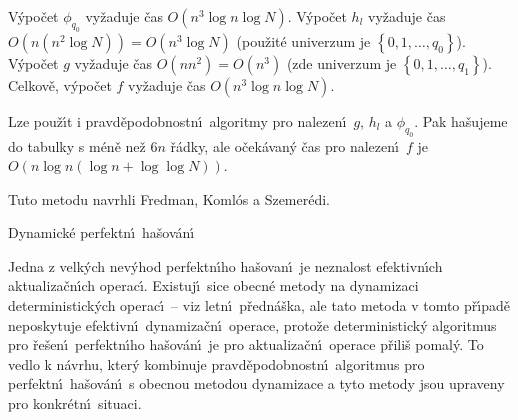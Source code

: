 \flushpar V\'ypo\v cet $\phi_{q_0}$ vy\v zaduje \v cas $O\left(n^3\log 
n\log N\right)$. V\'ypo\v cet $h_l$ 
vy\v za\-du\-je \v cas $O\left(n\left(n^2\log N\right)\right)=O\left(n^3\log N\right)$ (pou\v zit\'e univerzum je 
$\left\{0,1,\dots,q_0\right\}$). V\'ypo\v cet $g$ vy\v zaduje \v cas $O\left(nn^2
\right)=O\left(n^3\right)$ 
(zde univerzum je $\left\{0,1,\dots,q_1\right\}$). Celkov\v e, 
v\'ypo\v cet $f$ vy\v zaduje \v cas $O\left(n^3\log n\log N\right)$.
\medskip

\flushpar Lze pou\v z\'\i t i pravd\v epodobnostn\'\i\ algoritmy pro nalezen\'\i\ 
$g$, $h_l$ a $\phi_{q_0}$. Pak ha\v sujeme do tabulky s m\'en\v e ne\v z $
6n$ 
\v r\'adky, ale o\v cek\'avan\'y \v cas pro nalezen\'\i\ $f$ je 
$O\left(n\log n\left(\log n+\log\log N\right)\right)$.
\bigskip

\flushpar Tuto metodu navrhli Fredman, Koml\'os a Szemer\'edi.
\medskip

\subhead
Dynamick\'e perfektn\'\i\ ha\v sov\'an\'\i
\endsubhead
\smallskip

\flushpar Jedna z velk\'ych nev\'yhod perfektn\'\i ho ha\v sovan\'\i\ je 
neznalost efektivn\'\i ch aktualiza\v cn\'\i ch ope\-rac\'\i . Existuj\'\i\ sice 
obecn\'e meto\-dy na dynamizaci deterministick\'ych operac\'\i\ -- viz 
letn\'\i\ p\v redn\'a\v s\-ka, ale tato metoda v tomto p\v r\'\i pad\v e neposkytuje 
efektivn\'\i\ dynamiza\v cn\'\i\ operace, proto\v ze deterministick\'y 
algoritmus pro \v re\-\v se\-n\'\i\ perfektn\'\i ho ha\v sov\'an\'\i\ je pro 
aktualiza\v cn\'\i\ ope\-race p\v rili\v s pomal\'y. To vedlo k n\'avrhu, 
kter\'y kombinuje pravd\v epodobnostn\'\i\ algoritmus pro perfektn\'\i\ 
ha\v sov\'an\'\i\ s obecnou metodou dynami\-za\-ce a tyto metody jsou 
upraveny pro konkr\'etn\'\i\ situaci. 
\medskip

